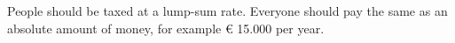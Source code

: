 People should be taxed at a lump-sum rate.
Everyone should pay the same as an absolute amount of money, for example € 15.000 per year.